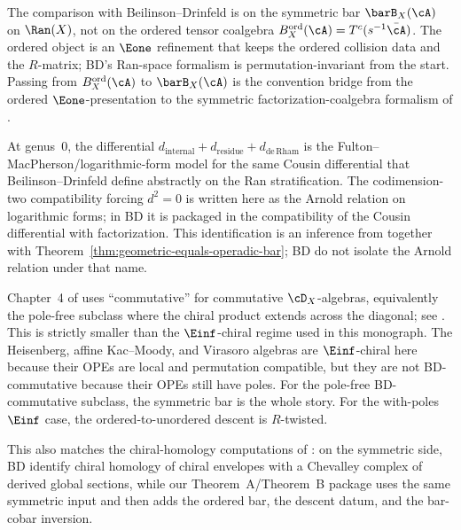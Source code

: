 \begin{remark}[BD comparison]\label{rem:bd-comparison-bar}
The comparison with Beilinson--Drinfeld is on the symmetric bar
$\barB_X(\cA)$ on $\Ran(X)$, not on the ordered tensor coalgebra
$B_X^{\mathrm{ord}}(\cA) = T^c(s^{-1}\bar\cA)$. The ordered object is an
$\Eone$ refinement that keeps the ordered collision data and the
$R$-matrix; BD's Ran-space formalism is permutation-invariant from the
start. Passing from $B_X^{\mathrm{ord}}(\cA)$ to $\barB_X(\cA)$ is the
convention bridge from the ordered $\Eone$-presentation to the
symmetric factorization-coalgebra formalism of
\cite[Theorem~3.4.9, §§3.4.11--3.4.12]{BD04}.

At genus~$0$, the differential
$d_{\mathrm{internal}} + d_{\mathrm{residue}} + d_{\mathrm{de\,Rham}}$
is the Fulton--MacPherson/logarithmic-form model for the same Cousin
differential that Beilinson--Drinfeld define abstractly on the Ran
stratification. The codimension-two compatibility forcing $d^2 = 0$ is
written here as the Arnold relation on logarithmic forms; in BD it is
packaged in the compatibility of the Cousin differential with
factorization. This identification is an inference from
\cite[§§3.4.11--3.4.12]{BD04} together with
Theorem~\ref{thm:geometric-equals-operadic-bar}; BD do not isolate the Arnold
relation under that name.

Chapter~4 of \cite{BD04} uses ``commutative'' for commutative
$\cD_X$-algebras, equivalently the pole-free subclass where the chiral
product extends across the diagonal; see \cite[Theorem~4.6.1]{BD04}.
This is strictly smaller than the $\Einf$-chiral regime used in this
monograph. The Heisenberg, affine Kac--Moody, and Virasoro algebras are
$\Einf$-chiral here because their OPEs are local and permutation
compatible, but they are not BD-commutative because their OPEs still
have poles. For the pole-free BD-commutative subclass, the symmetric bar
is the whole story. For the with-poles $\Einf$ case, the
ordered-to-unordered descent is $R$-twisted.

This also matches the chiral-homology computations of
\cite[Theorem~4.8.1]{BD04}: on the symmetric side, BD identify chiral
homology of chiral envelopes with a Chevalley complex of derived global
sections, while our Theorem~A/Theorem~B package uses the same symmetric
input and then adds the ordered bar, the descent datum, and the
bar-cobar inversion.
\end{remark}


